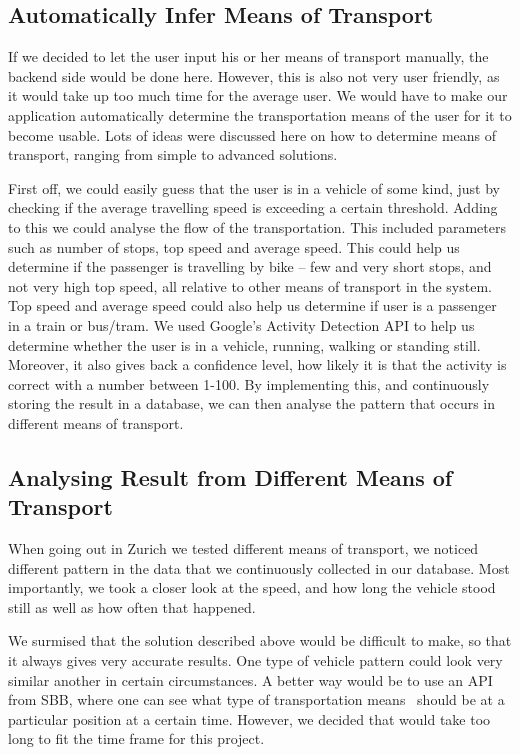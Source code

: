 \documentclass[10pt,conference,compsocconf]{IEEEtran}
\begin{document}
\subsection{Automatically Infer Means of Transport}

If we decided to let the user input his or her means of transport manually, the backend side would be done here. However, this is also not very user friendly, as it would take up too much time for the average user. We would have to make our application automatically determine the transportation means of the user for it to become usable. Lots of ideas were discussed here on how to determine means of transport, ranging from simple to advanced solutions.

First off, we could easily guess that the user is in a vehicle of some kind, just by checking if the average travelling speed is exceeding a certain threshold.
Adding to this we could analyse the flow of the transportation. This included parameters such as number of stops, top speed and average speed. This could help us determine if the passenger is travelling by bike – few and very short stops, and not very high top speed, all relative to other means of transport in the system. Top speed and average speed could also help us determine if user is a passenger in a train or bus/tram.
We used Google’s Activity Detection API to help us determine whether the user is in a vehicle, running, walking or standing still. Moreover, it also gives back a confidence level, how likely it is that the activity is correct with a number between 1-100. By implementing this, and continuously storing the result in a database, we can then analyse the pattern that occurs in different means of transport.


\subsection{Analysing Result from Different Means of Transport}

When going out in Zurich we tested different means of transport, we noticed different pattern in the data that we continuously collected in our database. Most importantly, we took a closer look at the speed, and how long the vehicle stood still as well as how often that happened. 

We surmised that the solution described above would be difficult to make, so that it always gives very accurate results. One type of vehicle pattern could look very similar another in certain circumstances. A better way would be to use an API from SBB, where one can see what type of transportation means  should be at a particular position at a certain time. However, we decided that would take too long to fit the time frame for this project.
\end{document}
